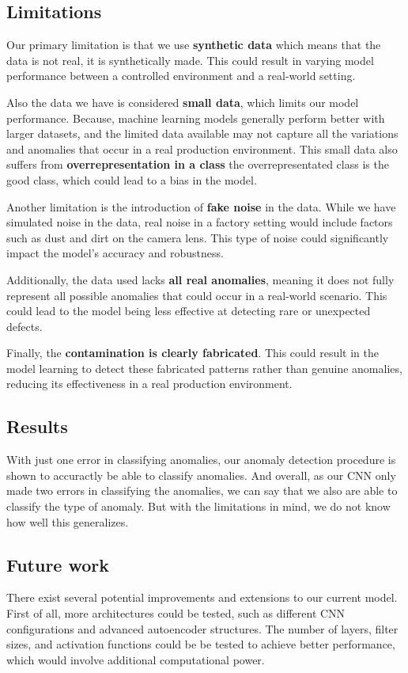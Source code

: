 \subsection{Limitations}

Our primary limitation is that we use \textbf{synthetic data} which means that the data is not real, it is synthetically made.
This could result in varying model performance between a controlled environment and a real-world setting.

Also the data we have is considered \textbf{small data}, which limits our model performance. 
Because, machine learning models generally perform better with larger datasets, and the limited data available may not capture all the variations and anomalies that occur in a real production environment.
This small data also suffers from \textbf{overrepresentation in a class} the overrepresentated class is the good class, which could lead to a bias in the model. 

Another limitation is the introduction of \textbf{fake noise} in the data.
While we have simulated noise in the data, real noise in a factory setting would include factors such as dust and dirt on the camera lens. 
This type of noise could significantly impact the model's accuracy and robustness.

Additionally, the data used lacks \textbf{all real anomalies}, meaning it does not fully represent all possible anomalies that could occur in a real-world scenario. 
This could lead to the model being less effective at detecting rare or unexpected defects.

Finally, the \textbf{contamination is clearly fabricated}.
This could result in the model learning to detect these fabricated patterns rather than genuine anomalies, reducing its effectiveness in a real production environment.

\subsection{Results}
With just one error in classifying anomalies, our anomaly detection procedure is shown to accuractly be able to classify anomalies. And overall, as our CNN only made two errors in classifying the anomalies, we can say that we also are able to classify the type of anomaly. But with the limitations in mind, we do not know how well this generalizes.

\subsection{Future work}
There exist several potential improvements and extensions to our current model. 
First of all, more architectures could be tested, such as different CNN configurations and advanced autoencoder structures. 
The number of layers, filter sizes, and activation functions could be be tested to achieve better performance, which would involve additional computational power.

